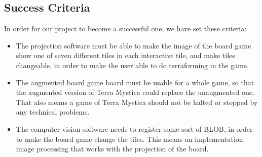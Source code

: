 \subsection{Success Criteria}
In order for our project to become a successful one, we have set these criteria:
\begin{itemize}
	\item The projection software must be able to make the image of the board game show one of seven different tiles in each interactive tile, and make tiles changeable, in order to make the user able to do terraforming in the game.
	\item The augmented board game board must be usable for a whole game, so that the augmented version of Terra Mystica could replace the unaugmented one. That also means a game of Terra Mystica should not be halted or stopped by any technical problems.
	\item The computer vision software needs to register some sort of BLOB, in order to make the board game change the tiles. This means an implementation image processing that works with the projection of the board.
\end{itemize} 